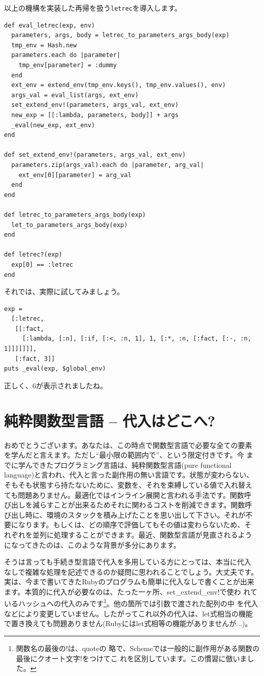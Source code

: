 以上の機構を実装した再帰を扱う{\tt letrec}を導入します。

\begin{lstlisting}
def eval_letrec(exp, env)
  parameters, args, body = letrec_to_parameters_args_body(exp)
  tmp_env = Hash.new
  parameters.each do |parameter| 
    tmp_env[parameter] = :dummy
  end
  ext_env = extend_env(tmp_env.keys(), tmp_env.values(), env)
  args_val = eval_list(args, ext_env)
  set_extend_env!(parameters, args_val, ext_env)
  new_exp = [[:lambda, parameters, body]] + args
  _eval(new_exp, ext_env)
end

def set_extend_env!(parameters, args_val, ext_env)
  parameters.zip(args_val).each do |parameter, arg_val|
    ext_env[0][parameter] = arg_val
  end
end

def letrec_to_parameters_args_body(exp)
  let_to_parameters_args_body(exp)
end

def letrec?(exp)
  exp[0] == :letrec
end
\end{lstlisting}

それでは、実際に試してみましょう。

\begin{lstlisting}
exp =
  [:letrec, 
   [[:fact,
     [:lambda, [:n], [:if, [:<, :n, 1], 1, [:*, :n, [:fact, [:-, :n, 1]]]]]]], 
   [:fact, 3]]
puts _eval(exp, $global_env)
\end{lstlisting}

正しく、6が表示されましたね。

\section{純粋関数型言語 -- 代入はどこへ?}

おめでとうございます。あなたは、この時点で関数型言語で必要な全ての要素
を学んだと言えます。ただし“最小限の範囲内で”、という限定付きです。今
までに学んできたプログラミング言語は、純粋関数型言語(pure functional
language)と言われ、代入と言った副作用の無い言語です。状態が変わらない、
そもそも状態すら持たないために、変数を、それを束縛している値で入れ替え
ても問題ありません。最適化ではインライン展開と言われる手法です。関数呼
び出しを減らすことが出来るためそれに関わるコストを削減できます。関数呼
び出し時に、環境のスタックを積み上げたことを思い出して下さい。それが不
要になります。もしくは、どの順序で評価してもその値は変わらないため、そ
れぞれを並列に処理することができます。最近、関数型言語が見直されるよう
になってきたのは、このような背景が多分にあります。

そうは言っても手続き型言語で代入を多用している方にとっては、本当に代入
なしで複雑な処理を記述できるのか疑問に思われることでしょう。大丈夫です。
実は、今まで書いてきたRubyのプログラムも簡単に代入なしで書くことが出来
ます。本質的に代入が必要なのは、たった一ヶ所、set\_extend\_env!で使わ
れているハッシュへの代入のみです\footnote{関数名の最後の!は、quoteの
略で、Schemeでは一般的に副作用がある関数の最後にクオート文字!をつけてこ
れを区別しています。この慣習に倣いました。}。他の箇所では引数で渡された配列の中
を代入などにより変更していません。したがってこれ以外の代入は、let式相当の機能
で置き換えても問題ありません(Rubyにはlet式相等の機能がありませんが...)。

